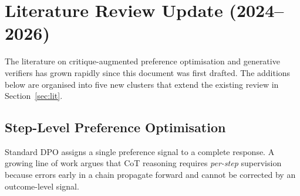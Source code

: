 
\section*{Literature Review Update (2024--2026)}

The literature on critique-augmented preference optimisation and
generative verifiers has grown rapidly since this document was first
drafted.  The additions below are organised into five new clusters
that extend the existing review in Section~\ref{sec:lit}.

\subsection{Step-Level Preference Optimisation}
\label{sec:step-dpo}

Standard DPO assigns a single preference signal to a complete
response.  A growing line of work argues that CoT reasoning requires
\emph{per-step} supervision because errors early in a chain
propagate forward and cannot be corrected by an outcome-level signal.



